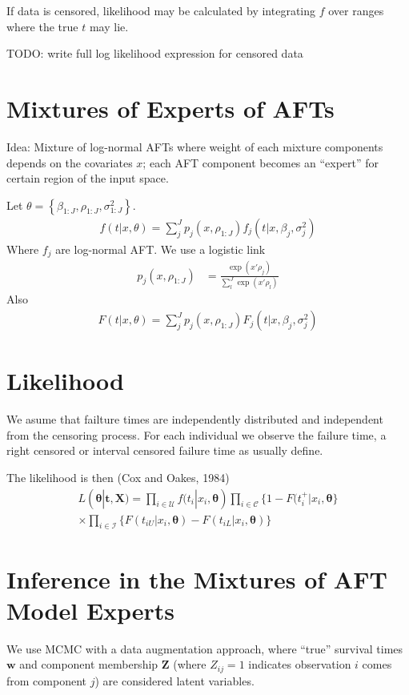 \documentclass[11pt,letterpaper]{article}
\begin{document}
If data is censored, likelihood may be calculated by integrating $f$ over ranges where the true $t$ may lie.

TODO: write full log likelihood expression for censored data

\section{Mixtures of Experts of AFTs}

Idea: Mixture of log-normal AFTs where weight of each mixture components depends on
the covariates $x$; each AFT component becomes an ``expert'' for certain region of the input space.

Let $\theta = \left\{ \beta_{1:J}, \rho_{1:J}, \sigma^2_{1:J} \right\}$.
\begin{align*}
    f(t|x, \theta) = \sum_{j}^J p_j(x, \rho_{1:J}) f_j(t|x, \beta_j, \sigma^2_j)
\end{align*}
Where $f_j$ are log-normal AFT. We use a logistic link
\begin{align*}
    p_j(x, \rho_{1:J}) &= \frac{\exp(x'\rho_j)}{\sum_l^J \exp(x'\rho_l)}
\end{align*}
Also
\begin{align*}
    F(t|x, \theta) = \sum_{j}^J p_j(x, \rho_{1:J}) F_j(t|x, \beta_j, \sigma^2_j)
\end{align*}
\section{Likelihood}
We asume that failture times are  independently distributed and independent from the censoring process. For each individual we observe the failure time, a right censored or interval censored failure time as usually define.

The likelihood is then (Cox and Oakes, 1984)
\begin{align}
\nonumber    L(\mathbf \theta | \mathbf{t} , \mathbf{X}) = \prod_{i\in \mathcal{U}}{} f(t_i| x_i, \mathbf{\theta})\prod_{i\in \mathcal{C} }\{1-F(t_i^+|x_i, \mathbf{\theta} \}\\
    \times \prod_{i\in \mathcal{I} }\{F(t_{iU}|x_i, \mathbf{\theta})-F(t_{iL}|x_i, \mathbf{\theta}) \}
\end{align}

\section{Inference in the Mixtures of AFT Model Experts}
We use MCMC with a data augmentation approach, where ``true'' survival times $
\mathbf{w}$ and component membership $\mathbf{Z}$ (where $Z_{ij}=1$ indicates
observation $i$ comes from component $j$) are considered latent variables.
\end{document}
